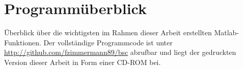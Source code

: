 \chapter{Programmüberblick}
Überblick über die wichtigsten im Rahmen dieser Arbeit erstellten Matlab-Funktionen. Der vollständige Programmcode ist unter {\url{http://github.com/fzimmermann89/bsc}} abrufbar und liegt der gedruckten Version dieser Arbeit in Form einer CD-ROM bei.
 
